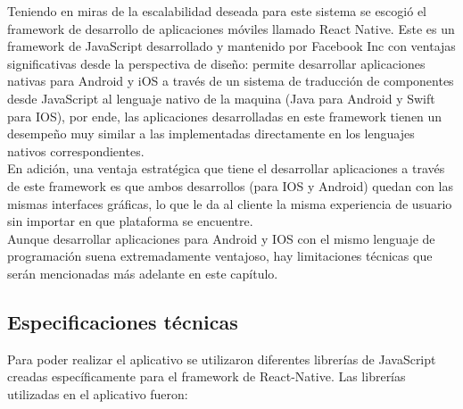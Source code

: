 
Teniendo en miras de la escalabilidad deseada para este sistema se escogió el framework de desarrollo de aplicaciones móviles llamado React Native. Este es un framework de JavaScript desarrollado y mantenido por Facebook Inc con ventajas significativas desde la perspectiva de diseño: permite desarrollar aplicaciones nativas para Android y iOS a través de un sistema de traducción de componentes desde JavaScript al lenguaje nativo de la maquina (Java para Android y Swift para IOS), por ende, las aplicaciones desarrolladas en este framework tienen un desempeño muy similar a las implementadas directamente en los lenguajes nativos correspondientes.
\vspace{0.5cm}\\
En adición, una ventaja estratégica que tiene el desarrollar aplicaciones a través de este framework es que ambos desarrollos (para IOS y Android) quedan con las mismas interfaces gráficas, lo que le da al cliente la misma experiencia de usuario sin importar en que plataforma se encuentre.
\vspace{0.5cm}\\
Aunque desarrollar aplicaciones para Android y IOS con el mismo lenguaje de programación suena extremadamente ventajoso, hay limitaciones técnicas que serán mencionadas más adelante en este capítulo.

\subsection{Especificaciones técnicas}

Para poder realizar el aplicativo se utilizaron diferentes librerías de JavaScript creadas específicamente para el framework de React-Native. Las librerías utilizadas en el aplicativo fueron:

